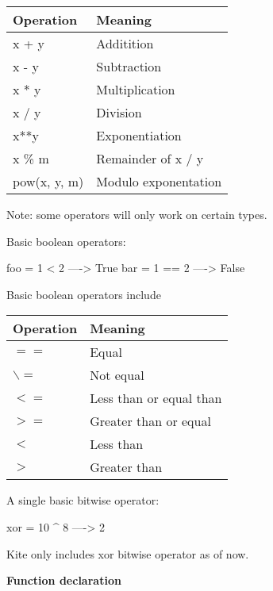 \begin{table}[H]
\centering
    \begin{tabular}{|l|l|}
    \hline
    Operation    & Meaning              \\ \hline
    x + y        & Additition           \\ \hline
    x - y        & Subtraction          \\ \hline
    x * y        & Multiplication       \\ \hline
    x / y        & Division             \\ \hline
    x**y         & Exponentiation       \\ \hline
    x \% m       & Remainder of x / y   \\ \hline
    pow(x, y, m) & Modulo exponentation \\ \hline
    \end{tabular}
\end{table}
Note: some operators will only work on certain types.

Basic boolean operators:
\begin{kite}
  
  foo = 1 < 2  ----> True
  bar = 1 == 2 ----> False
\end{kite}
Basic boolean operators include 
\begin{table}[H]
\centering
    \begin{tabular}{|l|l|}
    \hline
    Operation & Meaning                 \\ \hline
    $==$        & Equal                   \\ \hline
    $\backslash=$        & Not equal               \\ \hline
    $<=$        & Less than or equal than \\ \hline
    $>=$        & Greater than or equal   \\ \hline
    $<$         & Less than               \\ \hline
    $>$         & Greater than            \\ \hline
    \end{tabular}
\end{table}

A single basic bitwise operator:
\begin{kite}
  
  xor = 10 ^ 8 ----> 2
\end{kite}
Kite only includes xor bitwise operator as of now.

\textbf{Function declaration}

